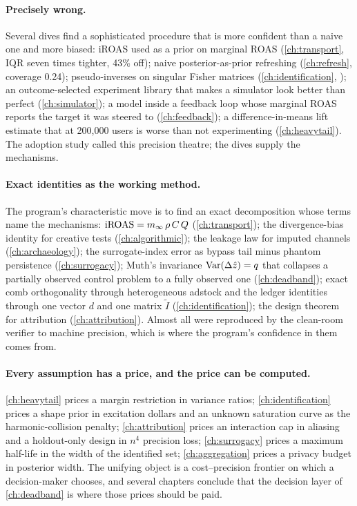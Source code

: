 \paragraph{Precisely wrong.}
Several dives find a sophisticated procedure that is more confident than a naive one and more biased:
iROAS used as a prior on marginal ROAS (\cref{ch:transport}, IQR seven times tighter, 43\% off); naive
posterior-as-prior refreshing (\cref{ch:refresh}, coverage 0.24); pseudo-inverses on singular Fisher
matrices (\cref{ch:identification}, ); an outcome-selected experiment library that makes a simulator
look better than perfect (\cref{ch:simulator}); a model inside a feedback loop whose marginal ROAS reports
the target it was steered to (\cref{ch:feedback}); a difference-in-means lift estimate that at 200,000 users is
worse than not experimenting (\cref{ch:heavytail}). The adoption study called this precision theatre; the
dives supply the mechanisms.

\paragraph{Exact identities as the working method.}
The program's characteristic move is to find an exact decomposition whose terms name the mechanisms:
$\mathrm{iROAS} = m_\infty\,\rho\,C\,Q$ (\cref{ch:transport}); the divergence-bias identity for creative tests
(\cref{ch:algorithmic}); the leakage law for imputed channels (\cref{ch:archaeology}); the surrogate-index
error as bypass tail minus phantom persistence (\cref{ch:surrogacy}); Muth's invariance
$\operatorname{Var}(\Delta\hat z) = q$ that collapses a partially observed control problem to a fully observed one
(\cref{ch:deadband}); exact comb orthogonality through heterogeneous adstock and the ledger identities
through one vector $d$ and one matrix $\tilde I$ (\cref{ch:identification}); the design theorem for
attribution (\cref{ch:attribution}). Almost all were reproduced by the clean-room verifier to machine
precision, which is where the program's confidence in them comes from.

\paragraph{Every assumption has a price, and the price can be computed.}
\cref{ch:heavytail} prices a margin restriction in variance ratios; \cref{ch:identification} prices a shape
prior in excitation dollars and an unknown saturation curve as the harmonic-collision penalty;
\cref{ch:attribution} prices an interaction cap in aliasing and a holdout-only design in $n^4$ precision loss;
\cref{ch:surrogacy} prices a maximum half-life in the width of the identified set; \cref{ch:aggregation}
prices a privacy budget in posterior width. The unifying object is a cost--precision frontier on which a
decision-maker chooses, and several chapters conclude that the decision layer of \cref{ch:deadband} is where
those prices should be paid.

